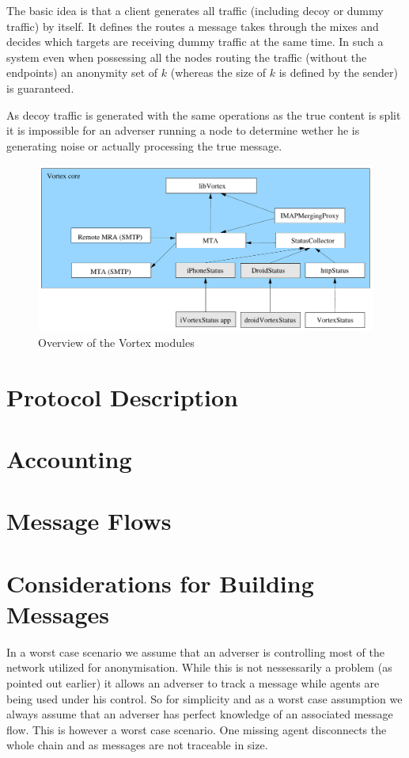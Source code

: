 The basic idea is that a client generates all traffic (including decoy or dummy traffic) by itself. It defines the routes a message takes through the mixes and decides which targets are receiving dummy traffic at the same time. In such a system even when possessing all the nodes routing the traffic (without the endpoints) an anonymity set of $k$ (whereas the size of $k$ is defined by the sender) is guaranteed.

As decoy traffic is generated with the same operations as the true content is split it is impossible for an adverser running a node to determine wether he is generating noise or actually processing the true message.

\begin{figure}[h]
	\includegraphics[width=\columnwidth]{inc/VortexModules.pdf}
	\caption{Overview of the Vortex modules}
	\label{fig:vortexModules}
\end{figure}

\section{Protocol Description}
\section{Accounting}
\section{Message Flows}

\section{Considerations for Building Messages}
In a worst case scenario we assume that an adverser is controlling most of the network utilized for anonymisation. While this is not nessessarily a problem (as pointed out earlier) it allows an adverser to track a message while agents are being used under his control. So for simplicity and as a worst case assumption we always assume that an adverser has perfect knowledge of an associated message flow. This is however a worst case scenario. One missing agent disconnects the whole chain and as messages are not traceable in size.

